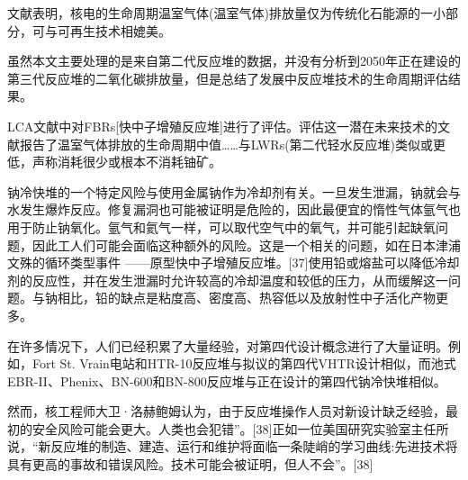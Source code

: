 文献表明，核电的生命周期温室气体(温室气体)排放量仅为传统化石能源的一小部分，可与可再生技术相媲美。

虽然本文主要处理的是来自第二代反应堆的数据，并没有分析到2050年正在建设的第三代反应堆的二氧化碳排放量，但是总结了发展中反应堆技术的生命周期评估结果。

LCA文献中对FBRs[快中子增殖反应堆]进行了评估。评估这一潜在未来技术的文献报告了温室气体排放的生命周期中值……与LWRs(第二代轻水反应堆)类似或更低，声称消耗很少或根本不消耗铀矿。

钠冷快堆的一个特定风险与使用金属钠作为冷却剂有关。一旦发生泄漏，钠就会与水发生爆炸反应。修复漏洞也可能被证明是危险的，因此最便宜的惰性气体氩气也用于防止钠氧化。氩气和氦气一样，可以取代空气中的氧气，并可能引起缺氧问题，因此工人们可能会面临这种额外的风险。这是一个相关的问题，如在日本津浦文殊的循环类型事件 ——原型快中子增殖反应堆。[37]使用铅或熔盐可以降低冷却剂的反应性，并在发生泄漏时允许较高的冷却温度和较低的压力，从而缓解这一问题。与钠相比，铅的缺点是粘度高、密度高、热容低以及放射性中子活化产物更多。

在许多情况下，人们已经积累了大量经验，对第四代设计概念进行了大量证明。例如，Fort St. Vrain电站和HTR-10反应堆与拟议的第四代VHTR设计相似，而池式EBR-II、Phenix、BN-600和BN-800反应堆与正在设计的第四代钠冷快堆相似。

然而，核工程师大卫·洛赫鲍姆认为，由于反应堆操作人员对新设计缺乏经验，最初的安全风险可能会更大。人类也会犯错”。[38]正如一位美国研究实验室主任所说，“新反应堆的制造、建造、运行和维护将面临一条陡峭的学习曲线:先进技术将具有更高的事故和错误风险。技术可能会被证明，但人不会”。[38]

